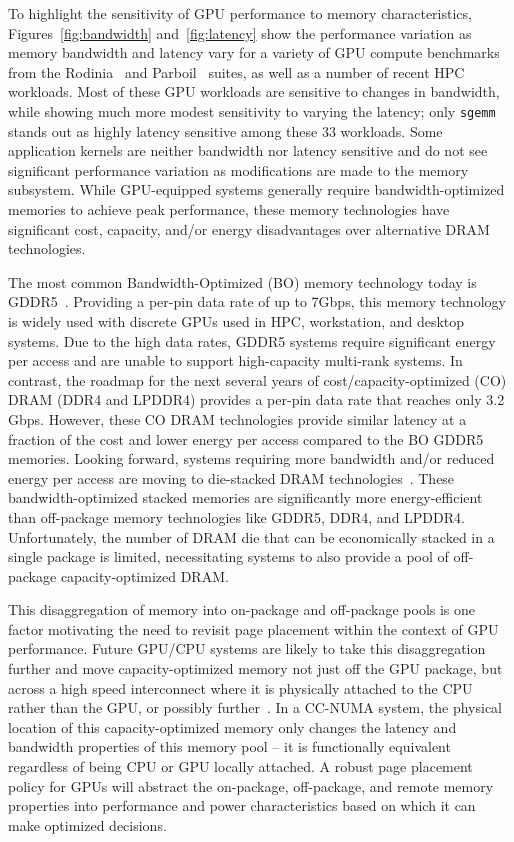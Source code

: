 To highlight the sensitivity of GPU performance to memory characteristics,
Figures~\ref{fig:bandwidth} and~\ref{fig:latency} show the performance variation
as memory bandwidth and latency vary for a variety of GPU compute benchmarks
from the Rodinia~\cite{Che2009} and {\color{black}Parboil~\cite{Parboil} suites,
as well as a number of recent HPC~\cite{comd,cns,minife,xsbench} workloads. Most
of these GPU workloads are sensitive to changes in bandwidth, while showing much
more modest sensitivity to varying the latency; only {\tt sgemm} stands out as
highly latency sensitive among these 33 workloads. Some application kernels are
neither bandwidth nor latency sensitive and do not see significant performance
variation as modifications are made to the memory subsystem.} While GPU-equipped
systems generally require bandwidth-optimized memories to achieve peak
performance, these memory technologies have significant cost, capacity, and/or
energy disadvantages over alternative DRAM technologies.

The most common Bandwidth-Optimized (BO) memory technology today is
GDDR5~\cite{GDDR5}.  Providing a per-pin data rate of up to 7Gbps, this memory
technology is widely used with discrete GPUs used in HPC, workstation, and
desktop systems.  Due to the high data rates, GDDR5 systems require significant
energy per access and are unable to support high-capacity multi-rank systems.
In contrast, the roadmap for the next several years of cost/capacity-optimized
(CO) DRAM (DDR4 and LPDDR4) provides a per-pin data rate that reaches only 3.2
Gbps.  However, these CO DRAM technologies provide similar latency at a fraction
of the cost and lower energy per access compared to the BO GDDR5 memories.
Looking forward, systems requiring more bandwidth and/or reduced energy per
access are moving to  die-stacked DRAM technologies~\cite{HBM,WIDEIO2}.  These
bandwidth-optimized stacked memories are significantly more energy-efficient
than off-package memory technologies like GDDR5, DDR4, and LPDDR4.
Unfortunately, the number of DRAM die that can be economically stacked in a
single package is limited, necessitating systems to also provide a pool of
off-package capacity-optimized DRAM.

This disaggregation of memory into on-package and off-package pools is one
factor motivating the need to revisit page placement within the context of GPU
performance.  Future GPU/CPU systems are likely to take this disaggregation
further and move capacity-optimized memory not just off the GPU package, but
across a high speed interconnect where it is physically attached to the CPU
rather than the GPU, or possibly further~\cite{Lim2009}.  In a CC-NUMA
system, the physical location of this capacity-optimized memory only changes the
latency and bandwidth properties of this memory pool -- it is functionally
equivalent regardless of being CPU or GPU locally attached.  A robust page
placement policy for GPUs will abstract the on-package, off-package, and remote
memory properties into performance and power characteristics based on which it
can make optimized decisions.

